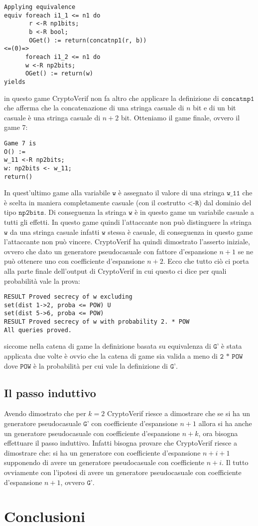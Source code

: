 \documentclass[a4paper,openright,twoside,12pt]{report}
\begin{document}
\begin{verbatim} 
Applying equivalence
equiv foreach i1_1 <= n1 do 
       r <-R np1bits; 
       b <-R bool; 
       OGet() := return(concatnp1(r, b))
<=(0)=>
      foreach i1_2 <= n1 do 
      w <-R np2bits; 
      OGet() := return(w)
yields
\end{verbatim}
in questo game CryptoVerif non fa altro che applicare la definizione di $\texttt{concatnp1}$ che afferma che la concatenazione di una stringa casuale di $n$ bit e di un bit casuale \`e una stringa casuale di $n+2$ bit.
Otteniamo il game finale, ovvero il game 7:
\begin{verbatim}
Game 7 is
O() :=
w_11 <-R np2bits;
w: np2bits <- w_11;
return()
\end{verbatim}
In quest'ultimo game alla variabile $\texttt{w}$ \`e assegnato il valore di una stringa $\texttt{w\_11}$ che \`e scelta in maniera completamente casuale (con il costrutto $\texttt{<-R}$) dal dominio del tipo $\texttt{np2bits}$.
Di conseguenza la stringa $\texttt{w}$ \`e in questo game un variabile casuale a tutti gli effetti.
In questo game quindi l'attaccante non pu\`o distinguere la stringa $\texttt{w}$ da una stringa casuale infatti $\texttt{w}$ stessa \`e casuale, di conseguenza in questo game l'attaccante non pu\`o vincere.
CryptoVerif ha quindi dimostrato l'asserto iniziale, ovvero che dato un generatore pseudocasuale con fattore d'espansione $n+1$ se ne pu\`o ottenere uno con coefficiente d'espansione $n+2$.
Ecco che tutto ci\`o ci porta alla parte finale dell'output di CryptoVerif in cui questo ci dice per quali probabilit\`a vale la prova:
\begin{verbatim} 
RESULT Proved secrecy of w excluding 
set(dist 1->2, proba <= POW) U 
set(dist 5->6, proba <= POW)
RESULT Proved secrecy of w with probability 2. * POW
All queries proved.
\end{verbatim}
siccome nella catena di game la definizione basata su equivalenza di $\texttt{G'}$ \`e stata applicata due volte \`e ovvio che la catena di game sia valida a meno di $\texttt{2 * POW}$ dove $\texttt{POW}$ \`e la probabilit\`a
per cui vale la definizione di $\texttt{G'}$.
\section{Il passo induttivo}
Avendo dimostrato che per $k=2$ CryptoVerif riesce a dimostrare che se si ha un generatore pseudocasuale $\texttt{G'}$ con coefficiente d'espansione $n+1$ allora si ha anche un generatore pseudocasuale con coefficiente d'espansione $n+k$, ora 
bisogna effettuare il passo induttivo. Infatti bisogna provare che CryptoVerif riesce a dimostrare che: si ha un generatore con coefficiente d'espansione $n+i+1$ supponendo di avere un generatore pseudocasuale con coefficiente
$n+i$. Il tutto ovviamente con l'ipotesi di avere un generatore pseudocasuale con coefficiente d'espansione $n+1$, ovvero $\texttt{G'}$.
\chapter{Conclusioni}
\lhead[\fancyplain{}{\bfseries\thepage}]{\fancyplain{}{\bfseries\rightmark}}
	
		
\end{document}
